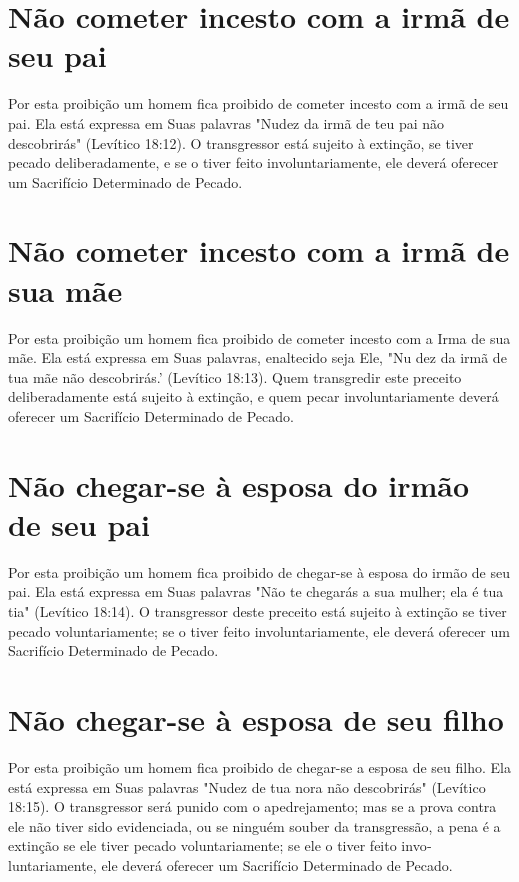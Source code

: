 \section{Não cometer incesto com a irmã de seu pai}

Por esta proibição um homem fica proibido de cometer incesto com a irmã
de seu pai. Ela está expressa em Suas palavras "Nudez da irmã de teu pai
não descobrirás" (Levítico 18:12). O transgressor está sujeito à
extinção, se tiver pecado deliberadamente, e se o tiver feito
involuntariamente, ele deve­rá oferecer um Sacrifício Determinado de
Pecado.

\section{Não cometer incesto com a irmã de sua mãe}

Por esta proibição um homem fica proibido de cometer incesto com a Irma
de sua mãe. Ela está expressa em Suas palavras, enaltecido seja Ele, "Nu
dez da irmã de tua mãe não descobrirás.' (Levítico
18:13). Quem transgredir este preceito deliberadamente está sujeito à
extinção, e quem pecar involunta­riamente deverá oferecer um Sacrifício
Determinado de Pecado.

\section{Não chegar-se à esposa do irmão de seu pai}

Por esta proibição um homem fica proibido de chegar-se à esposa do irmão
de seu pai. Ela está expressa em Suas palavras "Não te chegarás a sua
mulher; ela é tua tia" (Levítico 18:14). O transgressor deste preceito
está sujei­to à extinção se tiver pecado voluntariamente; se o tiver
feito involuntariamen­te, ele deverá oferecer um Sacrifício Determinado
de Pecado.

\section{Não chegar-se à esposa de seu filho}

Por esta proibição um homem fica proibido de chegar-se a esposa de seu
filho. Ela está expressa em Suas palavras "Nudez de tua nora não
descobrirás" (Levítico 18:15). O transgressor será punido com o
apedrejamento; mas se a pro­va contra ele não tiver sido evidenciada, ou
se ninguém souber da transgressão, a pena é a extinção se ele tiver
pecado voluntariamente; se ele o tiver feito invo­luntariamente, ele
deverá oferecer um Sacrifício Determinado de Pecado.

